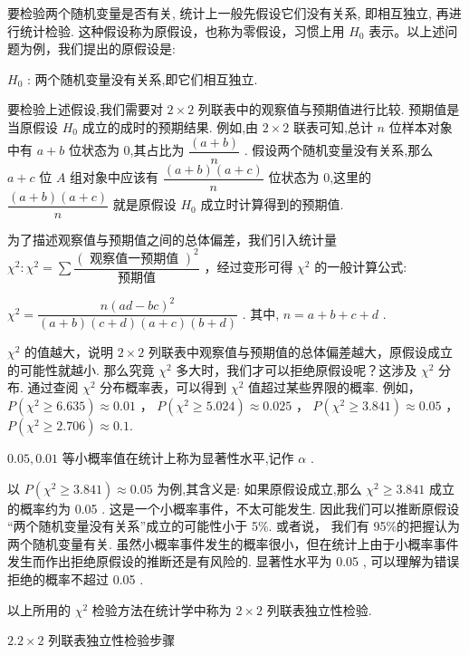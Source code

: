 要检验两个随机变量是否有关, 统计上一般先假设它们没有关系, 即相互独立, 再进行统计检验. 这种假设称为原假设，也称为零假设，习惯上用 ${H}_{0}$ 表示。以上述问题为例，我们提出的原假设是:

${H}_{0}$ : 两个随机变量没有关系,即它们相互独立.

要检验上述假设,我们需要对 $2 \times  2$ 列联表中的观察值与预期值进行比较. 预期值是当原假设 ${H}_{0}$ 成立的成时的预期结果. 例如,由 $2 \times  2$ 联表可知,总计 $n$ 位样本对象中有 $a + b$ 位状态为 0,其占比为 $\dfrac{\left( a + b\right) }{n}$ . 假设两个随机变量没有关系,那么 $a + c$ 位 $A$ 组对象中应该有 $\dfrac{\left( {a + b}\right) \left( {a + c}\right) }{n}$ 位状态为 0,这里的 $\dfrac{\left( {a + b}\right) \left( {a + c}\right) }{n}$ 就是原假设 ${H}_{0}$ 成立时计算得到的预期值.

为了描述观察值与预期值之间的总体偏差，我们引入统计量 ${\chi }^{2} : {\chi }^{2} = \sum \dfrac{{\left( \text{ 观察值一预期值 }\right) }^{2}}{\text{ 预期值 }}$ ，经过变形可得 ${\chi }^{2}$ 的一般计算公式:

${\chi }^{2} = \dfrac{n{\left( ad - bc\right) }^{2}}{\left( {a + b}\right) \left( {c + d}\right) \left( {a + c}\right) \left( {b + d}\right) }$ . 其中, $n = a + b + c + d$ .

${\chi }^{2}$ 的值越大，说明 $2 \times  2$ 列联表中观察值与预期值的总体偏差越大，原假设成立的可能性就越小. 那么究竟 ${\chi }^{2}$ 多大时，我们才可以拒绝原假设呢？这涉及 ${\chi }^{2}$ 分布. 通过查阅 ${\chi }^{2}$ 分布概率表，可以得到 ${\chi }^{2}$ 值超过某些界限的概率. 例如， $P\left( {{\chi }^{2} \geq  {6.635}}\right)  \approx  {0.01}$ ， $P\left( {{\chi }^{2} \geq  {5.024}}\right)  \approx  {0.025}$ ， $P\left( {{\chi }^{2} \geq  {3.841}}\right)  \approx  {0.05}$ ， $P\left( {{\chi }^{2} \geq  {2.706}}\right)  \approx  {0.1}.$

${0.05},{0.01}$ 等小概率值在统计上称为显著性水平,记作 $\alpha$ .

以 $P\left( {{\chi }^{2} \geq  {3.841}}\right)  \approx  {0.05}$ 为例,其含义是: 如果原假设成立,那么 ${\chi }^{2} \geq  {3.841}$ 成立的概率约为 0.05 . 这是一个小概率事件，不太可能发生. 因此我们可以推断原假设 “两个随机变量没有关系”成立的可能性小于 5\%. 或者说， 我们有 95\%的把握认为两个随机变量有关. 虽然小概率事件发生的概率很小，但在统计上由于小概率事件发生而作出拒绝原假设的推断还是有风险的. 显著性水平为 0.05 , 可以理解为错误拒绝的概率不超过 0.05 .

以上所用的 ${\chi }^{2}$ 检验方法在统计学中称为 $2 \times  2$ 列联表独立性检验.

${2.2} \times  2$ 列联表独立性检验步骤

